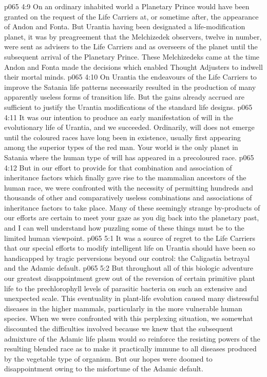 \vs p065 4:9 On an ordinary inhabited world a Planetary Prince would have been granted on the request of the Life Carriers at, or sometime after, the appearance of Andon and Fonta. But Urantia having been designated a life\hyp{}modification planet, it was by preagreement that the Melchizedek observers, twelve in number, were sent as advisers to the Life Carriers and as overseers of the planet until the subsequent arrival of the Planetary Prince. These Melchizedeks came at the time Andon and Fonta made the decisions which enabled Thought Adjusters to indwell their mortal minds.
\vs p065 4:10 \pc On Urantia the endeavours of the Life Carriers to improve the Satania life patterns necessarily resulted in the production of many apparently useless forms of transition life. But the gains already accrued are sufficient to justify the Urantia modifications of the standard life designs.
\vs p065 4:11 It was our intention to produce an early manifestation of will in the evolutionary life of Urantia, and we succeeded. Ordinarily, will does not emerge until the coloured races have long been in existence, usually first appearing among the superior types of the red man. Your world is the only planet in Satania where the human type of will has appeared in a precoloured race.
\vs p065 4:12 But in our effort to provide for that combination and association of inheritance factors which finally gave rise to the mammalian ancestors of the human race, we were confronted with the necessity of permitting hundreds and thousands of other and comparatively useless combinations and associations of inheritance factors to take place. Many of these seemingly strange by\hyp{}products of our efforts are certain to meet your gaze as you dig back into the planetary past, and I can well understand how puzzling some of these things must be to the limited human viewpoint.
\vs p065 5:1 It was a source of regret to the Life Carriers that our special efforts to modify intelligent life on Urantia should have been so handicapped by tragic perversions beyond our control: the Caligastia betrayal and the Adamic default.
\vs p065 5:2 But throughout all of this biologic adventure our greatest disappointment grew out of the reversion of certain primitive plant life to the prechlorophyll levels of parasitic bacteria on such an extensive and unexpected scale. This eventuality in plant\hyp{}life evolution caused many distressful diseases in the higher mammals, particularly in the more vulnerable human species. When we were confronted with this perplexing situation, we somewhat discounted the difficulties involved because we knew that the subsequent admixture of the Adamic life plasm would so reinforce the resisting powers of the resulting blended race as to make it practically immune to all diseases produced by the vegetable type of organism. But our hopes were doomed to disappointment owing to the misfortune of the Adamic default.
